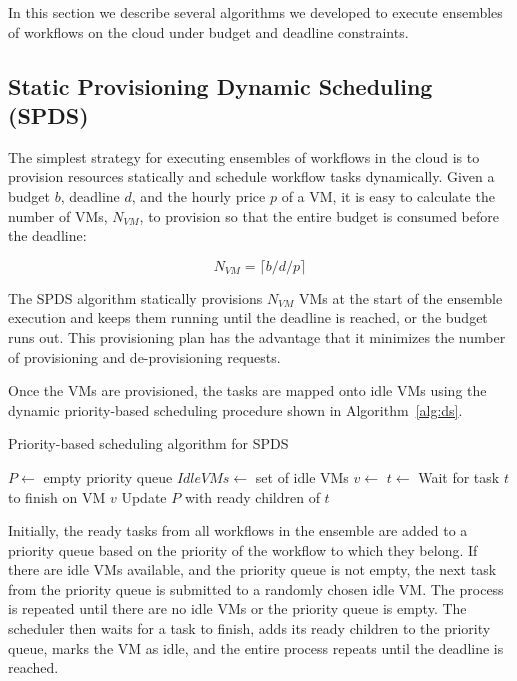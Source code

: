 \documentclass{sig-alternate}
\begin{document}
In this section we describe several algorithms we developed to execute ensembles of
workflows on the cloud under budget and deadline constraints.

\subsection{Static Provisioning Dynamic Scheduling \\
(SPDS) }
\label{sec:spds}

The simplest strategy for executing ensembles of workflows in the cloud is to
provision resources statically and schedule workflow tasks dynamically. Given a 
budget $b$, deadline $d$, and the hourly price $p$ of a VM, it is easy to calculate
the number of VMs, $N_{VM}$, to provision so that the entire budget is consumed before
the deadline:

\begin{equation}
\label{eq:static-plan}
N_{VM} = \lceil b / d / p \rceil
\end{equation}

The SPDS algorithm statically provisions $N_{VM}$ VMs at the start of the ensemble execution 
and keeps them running until the deadline is reached, or the budget runs out.
This provisioning plan has the advantage that it minimizes the number of provisioning 
and de-provisioning requests.

Once the VMs are provisioned, the tasks are mapped onto idle VMs using the dynamic
priority-based scheduling procedure shown in Algorithm~\ref{alg:ds}.

\begin{algorithm}
\caption{Priority-based scheduling algorithm for SPDS}
\label{alg:ds}
\begin{algorithmic}[1]
    \State $P\gets$ empty priority queue
	\State $IdleVMs\gets$ set of idle VMs
    	\State {} 
    \EndFor
    		\State $v\gets$ 
    		\State $t\gets$ 
    		\State {}
    	\EndWhile
    	\State Wait for task $t$ to finish on VM $v$
    	\State Update $P$ with ready children of $t$
		\State {}
    \EndWhile
\EndProcedure
\end{algorithmic} 
\end{algorithm}

Initially, the ready tasks from all workflows in the ensemble are added to a 
priority queue based on the priority of the workflow to which they belong. If
there are idle VMs available, and the priority queue is not empty, the next task
from the priority queue is submitted to a randomly chosen idle VM. The process is 
repeated until there are no idle VMs or the priority queue is empty. The scheduler
then waits for a task to finish, adds its ready children to the priority queue,
marks the VM as idle, and the entire process repeats until the deadline is reached.
\end{document}
